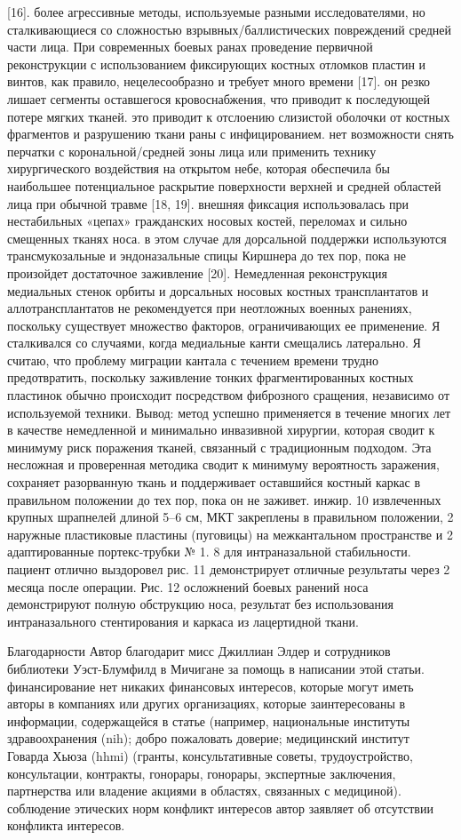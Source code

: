 [16]. более агрессивные методы, используемые разными исследователями, но
сталкивающиеся со сложностью взрывных/баллистических повреждений средней части
лица. При современных боевых ранах проведение первичной реконструкции с
использованием фиксирующих костных отломков пластин и винтов, как правило,
нецелесообразно и требует много времени [17]. он резко лишает сегменты
оставшегося кровоснабжения, что приводит к последующей потере мягких тканей. это
приводит к отслоению слизистой оболочки от костных фрагментов и разрушению ткани
раны с инфицированием. нет возможности снять перчатки с корональной/средней зоны
лица или применить технику хирургического воздействия на открытом небе, которая
обеспечила бы наибольшее потенциальное раскрытие поверхности верхней и средней
областей лица при обычной травме [18, 19]. внешняя фиксация использовалась при
нестабильных «цепах» гражданских носовых костей, переломах и сильно смещенных
тканях носа. в этом случае для дорсальной поддержки используются
трансмукозальные и эндоназальные спицы Киршнера до тех пор, пока не произойдет
достаточное заживление [20]. Немедленная реконструкция медиальных стенок орбиты
и дорсальных носовых костных трансплантатов и аллотрансплантатов не
рекомендуется при неотложных военных ранениях, поскольку существует множество
факторов, ограничивающих ее применение. Я сталкивался со случаями, когда
медиальные канти смещались латерально. Я считаю, что проблему миграции кантала с
течением времени трудно предотвратить, поскольку заживление тонких
фрагментированных костных пластинок обычно происходит посредством фиброзного
сращения, независимо от используемой техники. Вывод: метод успешно применяется в
течение многих лет в качестве немедленной и минимально инвазивной хирургии,
которая сводит к минимуму риск поражения тканей, связанный с традиционным
подходом. Эта несложная и проверенная методика сводит к минимуму вероятность
заражения, сохраняет разорванную ткань и поддерживает оставшийся костный каркас
в правильном положении до тех пор, пока он не заживет. инжир. 10 извлеченных
крупных шрапнелей длиной 5–6 см, МКТ закреплены в правильном положении, 2
наружные пластиковые пластины (пуговицы) на межкантальном пространстве и 2
адаптированные портекс-трубки № 1. 8 для интраназальной стабильности. пациент
отлично выздоровел рис. 11 демонстрирует отличные результаты через 2 месяца
после операции. Рис. 12 осложнений боевых ранений носа демонстрируют полную
обструкцию носа, результат без использования интраназального стентирования и
каркаса из лацертидной ткани.

Благодарности Автор благодарит мисс Джиллиан Элдер и сотрудников библиотеки
Уэст-Блумфилд в Мичигане за помощь в написании этой статьи. финансирование нет
никаких финансовых интересов, которые могут иметь авторы в компаниях или других
организациях, которые заинтересованы в информации, содержащейся в статье
(например, национальные институты здравоохранения (nih); добро пожаловать
доверие; медицинский институт Говарда Хьюза (hhmi) (гранты, консультативные
советы, трудоустройство, консультации, контракты, гонорары, гонорары,
экспертные заключения, партнерства или владение акциями в областях, связанных с
медициной). соблюдение этических норм конфликт интересов автор заявляет об
отсутствии конфликта интересов.
